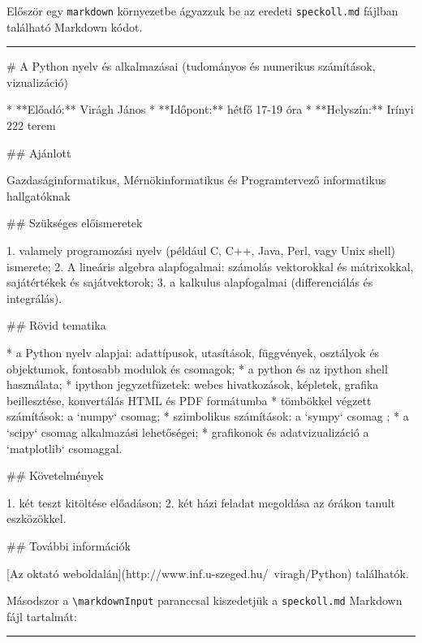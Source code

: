 \documentclass{article}
\begin{document}
Először egy \verb|markdown| környezetbe ágyazzuk be az eredeti \verb|speckoll.md| fájlban található Markdown kódot.	

\rule{\linewidth}{1pt}

\begin{markdown}
# A Python nyelv és alkalmazásai (tudományos és numerikus számítások, vizualizáció)

* **Előadó:** Virágh János
* **Időpont:** hétfő 17-19 óra
* **Helyszín:** Irínyi 222 terem

## Ajánlott

Gazdaságinformatikus, Mérnökinformatikus és Programtervező informatikus hallgatóknak

## Szükséges előismeretek

1. valamely programozási nyelv (például C, C++, Java, Perl, vagy Unix shell) ismerete;
2. A lineáris algebra alapfogalmai: számolás vektorokkal és mátrixokkal, sajátértékek és sajátvektorok;
3. a kalkulus alapfogalmai (differenciálás és integrálás).

## Rövid tematika

* a Python nyelv alapjai: adattípusok, utasítások, függvények, osztályok és objektumok, fontosabb modulok és csomagok;
* a python és az ipython shell használata;
* ipython jegyzetfüzetek: webes hivatkozások, képletek, grafika beillesztése, konvertálás HTML és PDF formátumba
* tömbökkel végzett számítások:  a `numpy` csomag;
* szimbolikus számítások: a `sympy` csomag ;
* a `scipy` csomag alkalmazási lehetőségei;
* grafikonok és adatvizualizáció a `matplotlib` csomaggal.

## Követelmények

1. két teszt kitöltése előadáson;
2. két házi feladat megoldása az órákon tanult eszközökkel.

## További információk

[Az oktató weboldalán](http://www.inf.u-szeged.hu/~viragh/Python) találhatók.
\end{markdown}

Másodszor a  \verb|\markdownInput| paranccsal kiszedetjük a \verb|speckoll.md| Markdown fájl tartalmát:

\rule{\linewidth}{1pt}

\end{document}
